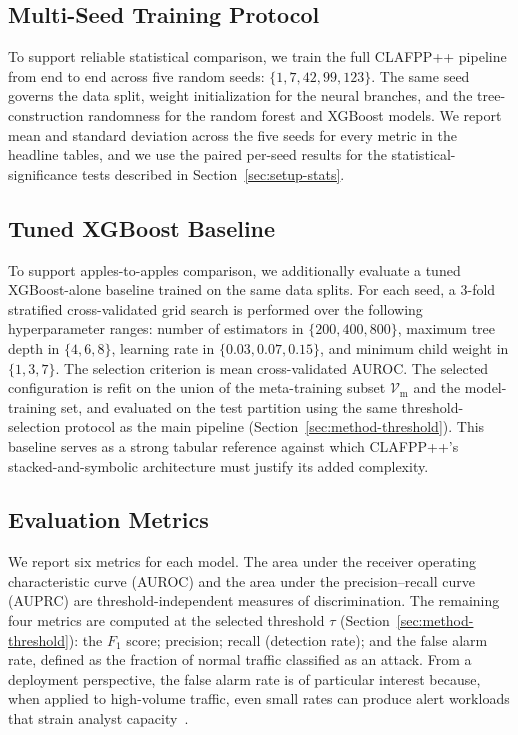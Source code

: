 \documentclass[pdflatex,sn-mathphys-num]{sn-jnl}
\theoremstyle{thmstyleone}
\theoremstyle{thmstyletwo}
\theoremstyle{thmstylethree}
\begin{document}
\subsection{Multi-Seed Training Protocol}\label{sec:setup-seeds}

To support reliable statistical comparison, we train the full CLAFPP++ pipeline from end to end across five random seeds: $\{1, 7, 42, 99, 123\}$. The same seed governs the data split, weight initialization for the neural branches, and the tree-construction randomness for the random forest and XGBoost models. We report mean and standard deviation across the five seeds for every metric in the headline tables, and we use the paired per-seed results for the statistical-significance tests described in Section~\ref{sec:setup-stats}.

\subsection{Tuned XGBoost Baseline}\label{sec:setup-baseline}

To support apples-to-apples comparison, we additionally evaluate a tuned XGBoost-alone baseline trained on the same data splits. For each seed, a $3$-fold stratified cross-validated grid search is performed over the following hyperparameter ranges: number of estimators in $\{200, 400, 800\}$, maximum tree depth in $\{4, 6, 8\}$, learning rate in $\{0.03, 0.07, 0.15\}$, and minimum child weight in $\{1, 3, 7\}$. The selection criterion is mean cross-validated AUROC. The selected configuration is refit on the union of the meta-training subset $\mathcal{V}_{\mathrm{m}}$ and the model-training set, and evaluated on the test partition using the same threshold-selection protocol as the main pipeline (Section~\ref{sec:method-threshold}). This baseline serves as a strong tabular reference against which CLAFPP++'s stacked-and-symbolic architecture must justify its added complexity.

\subsection{Evaluation Metrics}\label{sec:setup-metrics}

We report six metrics for each model. The area under the receiver operating characteristic curve (AUROC) and the area under the precision--recall curve (AUPRC) are threshold-independent measures of discrimination. The remaining four metrics are computed at the selected threshold $\tau$ (Section~\ref{sec:method-threshold}): the $F_1$ score; precision; recall (detection rate); and the false alarm rate, defined as the fraction of normal traffic classified as an attack. From a deployment perspective, the false alarm rate is of particular interest because, when applied to high-volume traffic, even small rates can produce alert workloads that strain analyst capacity~\cite{shone2017deep}.
\end{document}
